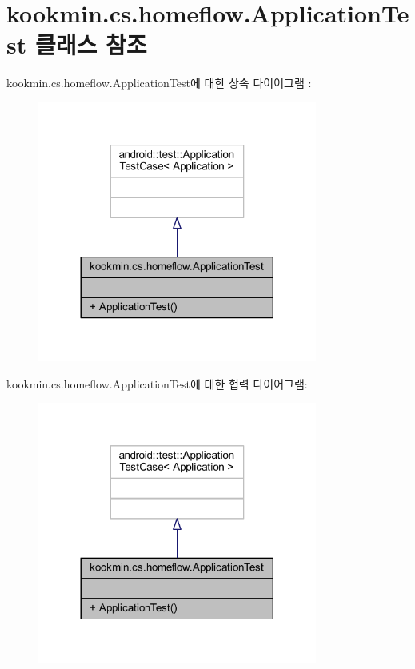 \hypertarget{classkookmin_1_1cs_1_1homeflow_1_1_application_test}{}\section{kookmin.\+cs.\+homeflow.\+Application\+Test 클래스 참조}
\label{classkookmin_1_1cs_1_1homeflow_1_1_application_test}


kookmin.\+cs.\+homeflow.\+Application\+Test에 대한 상속 다이어그램 \+: \nopagebreak
\begin{figure}[H]
\begin{center}
\leavevmode
\includegraphics[width=260pt]{classkookmin_1_1cs_1_1homeflow_1_1_application_test__inherit__graph}
\end{center}
\end{figure}


kookmin.\+cs.\+homeflow.\+Application\+Test에 대한 협력 다이어그램\+:\nopagebreak
\begin{figure}[H]
\begin{center}
\leavevmode
\includegraphics[width=260pt]{classkookmin_1_1cs_1_1homeflow_1_1_application_test__coll__graph}
\end{center}
\end{figure}


